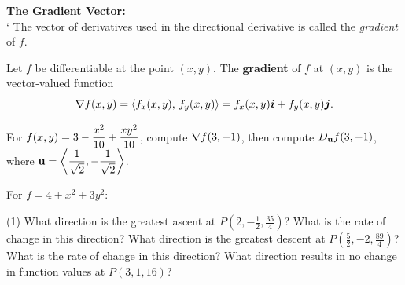 \documentclass[mathNotesPreamble]{subfiles}
\begin{document}
  \noindent
  \textbf{The Gradient Vector:}\\`
  The vector of derivatives used in the directional derivative is called the \textit{gradient} of $f$.
  \begin{defn*}
    Let $f$ be differentiable at the point $(x,y)$. The \textbf{gradient} of $f$ at $(x,y)$ is the vector-valued function
      \[\nabla f(x,y)={\left\langle f_x(x,y),\,f_y(x,y) \right\rangle}=f_x(x,y){\bm{i}}+f_y(x,y){\bm{j}}.\]
  \end{defn*}

  \begin{ex*}
    For $\displaystyle f(x,y)=3-\frac{x^2}{10}+\frac{xy^2}{10}$, compute $\nabla f(3,-1)$, then compute $D_{\mathbf{u}} f(3,-1)$, where $\displaystyle{\mathbf{u}}={\left\langle \frac{1}{\sqrt{2}},-\frac{1}{\sqrt{2}} \right\rangle}$.
  \end{ex*}

  \noindent
  \pagebreak

  \begin{ex*}
    For $f=4+x^2+3y^2$: 
  \end{ex*}
  \begin{tasks}[after-item-skip=\stretch{1}, label=](1)
    \task What direction is the greatest ascent at $P(2,-\frac{1}{2}, \frac{35}{4})$? What is the rate of change in this direction?
    \task What direction is the greatest descent at $P(\frac{5}{2},-2, \frac{89}{4})$? What is the rate of  change in this direction?
    \task What direction results in no change in function values at $P(3,1, 16)$?
  \end{tasks}
  \pagebreak
\end{document}
